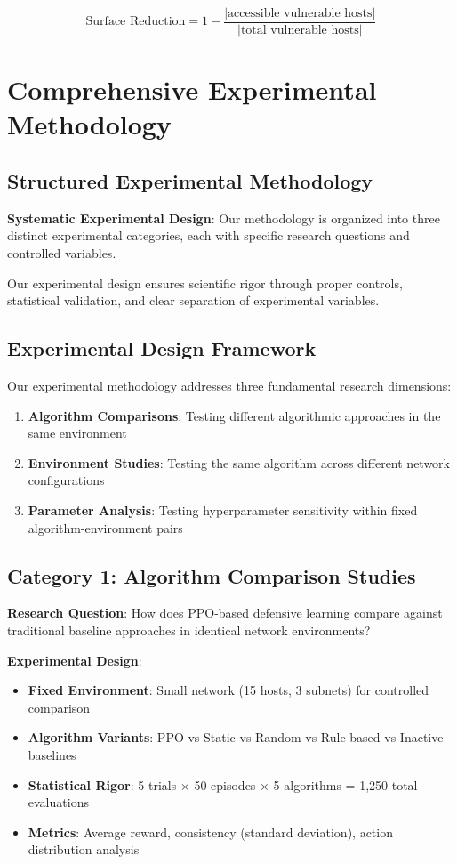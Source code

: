 \documentclass[12pt,twoside]{article}
\theoremstyle{definition}
\theoremstyle{plain}
\begin{document}
\begin{equation}
\text{Surface Reduction} = 1 - \frac{|\text{accessible vulnerable hosts}|}{|\text{total vulnerable hosts}|}
\end{equation}

\section{Comprehensive Experimental Methodology}

\subsection{Structured Experimental Methodology}

\textbf{Systematic Experimental Design}: Our methodology is organized into three distinct experimental categories, each with specific research questions and controlled variables.

Our experimental design ensures scientific rigor through proper controls, statistical validation, and clear separation of experimental variables.

\subsection{Experimental Design Framework}

Our experimental methodology addresses three fundamental research dimensions:

\begin{enumerate}
\item \textbf{Algorithm Comparisons}: Testing different algorithmic approaches in the same environment
\item \textbf{Environment Studies}: Testing the same algorithm across different network configurations  
\item \textbf{Parameter Analysis}: Testing hyperparameter sensitivity within fixed algorithm-environment pairs
\end{enumerate}

\subsection{Category 1: Algorithm Comparison Studies}

\textbf{Research Question}: How does PPO-based defensive learning compare against traditional baseline approaches in identical network environments?

\textbf{Experimental Design}:
\begin{itemize}
\item \textbf{Fixed Environment}: Small network (15 hosts, 3 subnets) for controlled comparison
\item \textbf{Algorithm Variants}: PPO vs Static vs Random vs Rule-based vs Inactive baselines
\item \textbf{Statistical Rigor}: 5 trials × 50 episodes × 5 algorithms = 1,250 total evaluations
\item \textbf{Metrics}: Average reward, consistency (standard deviation), action distribution analysis
\end{itemize}
\end{document}
